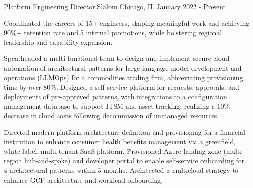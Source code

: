 

\begin{cventries}

  \cventry
    {Platform Engineering Director} %
    {Slalom} %
    {Chicago, IL} %
    {January 2022 - Present} %
    {
      \begin{cvitems} %
        \item {Coordinated the careers of 15+ engineers, shaping meaningful work and achieving 90\%+ retention rate and 5 internal promotions, while bolstering regional leadership and capability expansion.}
        \item {Spearheaded a multi-functional team to design and implement secure cloud automation of architectural patterns for large language model development and operations (LLMOps) for a commodities trading firm, abbreviating provisioning time by over 80\%. Designed a self-service platform for requests, approvals, and deployments of pre-approved patterns, with integrations to a configuration management database to support ITSM and asset tracking, realizing a 10\% decrease in cloud costs following decommission of unmanaged resources.}
        \item {Directed modern platform architecture definition and provisioning for a financial institution to enhance consumer health benefits management via a greenfield, white-label, multi-tenant SaaS platform. Provisioned Azure landing zone (multi-region hub-and-spoke) and developer portal to enable self-service onboarding for 4 architectural patterns within 3 months. Architected a multicloud strategy to enhance GCP architecture and workload onboarding.}
      \end{cvitems}
    }


\end{cventries}
